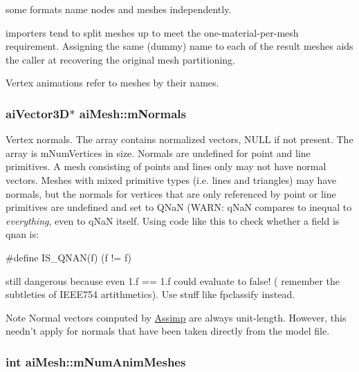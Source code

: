 \begin{DoxyItemize}
\item some formats name nodes and meshes independently.
\item importers tend to split meshes up to meet the one-\/material-\/per-\/mesh requirement. Assigning the same (dummy) name to each of the result meshes aids the caller at recovering the original mesh partitioning.
\item Vertex animations refer to meshes by their names. 
\end{DoxyItemize}\hypertarget{structai_mesh_aec81b496b4d93838cef038933dabe9b9}{
\subsubsection[{m\-Normals}]{ {\bf ai\-Vector3\-D}$\ast$ ai\-Mesh\-::m\-Normals}}\label{structai_mesh_aec81b496b4d93838cef038933dabe9b9}
Vertex normals. The array contains normalized vectors, N\-U\-L\-L if not present. The array is m\-Num\-Vertices in size. Normals are undefined for point and line primitives. A mesh consisting of points and lines only may not have normal vectors. Meshes with mixed primitive types (i.\-e. lines and triangles) may have normals, but the normals for vertices that are only referenced by point or line primitives are undefined and set to Q\-Na\-N (W\-A\-R\-N\-: q\-Na\-N compares to inequal to {\itshape everything}, even to q\-Na\-N itself. Using code like this to check whether a field is qnan is\-: 
\begin{DoxyCode}
\textcolor{preprocessor}{#define IS\_QNAN(f) (f != f)}
\end{DoxyCode}
 still dangerous because even 1.\-f == 1.\-f could evaluate to false! ( remember the subtleties of I\-E\-E\-E754 artithmetics). Use stuff like {\ttfamily fpclassify} instead. \begin{DoxyNote}{Note}
Normal vectors computed by \hyperlink{namespace_assimp}{Assimp} are always unit-\/length. However, this needn't apply for normals that have been taken directly from the model file. 
\end{DoxyNote}
\hypertarget{structai_mesh_a1692a300222b32348ae51779df4a697e}{
\subsubsection[{m\-Num\-Anim\-Meshes}]{ {\bf int} ai\-Mesh\-::m\-Num\-Anim\-Meshes}}\label{structai_mesh_a1692a300222b32348ae51779df4a697e}
